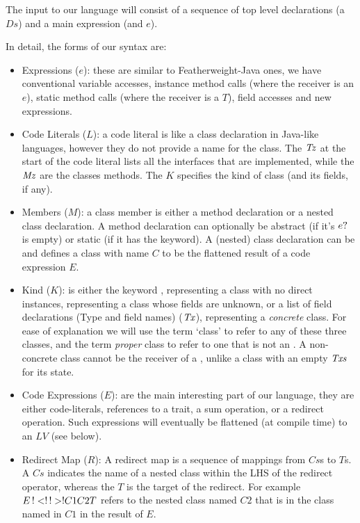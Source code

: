 The input to our language will consist of a sequence of top level declarations (a $Ds$) and a main expression (and $e$).

In detail, the forms of our syntax are:
\begin{itemize}
	\item Expressions ($e$): these are similar to Featherweight-Java ones, we have conventional variable accesses, instance method calls (where the receiver is an $e$), static method calls (where the receiver is a $T$), field accesses and new expressions.
	\item Code Literals ($L$): a code literal is like a class declaration in Java-like languages, however they do not provide a name for the class. The $\mathit{Tz}$ at the start of the code literal lists all the interfaces that are implemented, while the $\mathit{Mz}$ are the classes methods. The $K$ specifies the kind of class (and its fields, if any).
	\item Members ($M$): a class member is either a method declaration or a nested class declaration. A method declaration can optionally be abstract (if it's $e?$ is empty) or static (if it has the  keyword). A (nested) class declaration can be  and defines a class with name $C$ to be the flattened result of a code expression $E$.
	\item Kind ($K$): is either the keyword , representing a class with no direct instances,  representing a class whose fields are unknown, or a list of field declarations (Type and field names) ($\mathit{Tx}$), representing a \emph{concrete} class. For ease of explanation we will use the term `class' to refer to any of these three classes, and the term \emph{proper} class to refer to one that is not an . A non-concrete class cannot be the receiver of a , unlike a class with an empty $\mathit{Txs}$ for its state. 
	\item Code Expressions ($E$): are the main interesting part of our language, they are either code-literals, references to a trait, a sum operation, or a redirect operation. Such expressions will eventually be flattened (at compile time) to an $LV$ (see below).
	\item Redirect Map ($R$): A redirect map is a sequence of mappings from $Cs$s to $T$s. A $Cs$ indicates the name of a nested class within the LHS of the redirect operator, whereas the $T$ is the target of the redirect. For example $\red{E}{\Cs{C1}{C2}}{T}$ refers to the nested class named $C2$ that is in the class named in $C1$ in the result of $E$.

\end{itemize}
